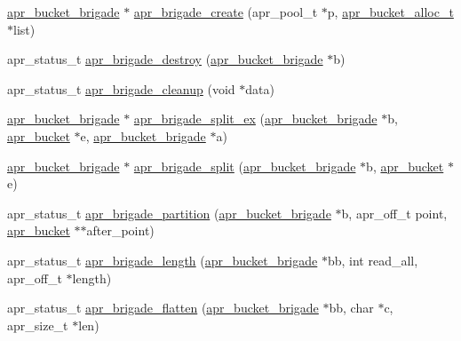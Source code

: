 \begin{DoxyCompactItemize}
\item 
\hyperlink{structapr__bucket__brigade}{apr\-\_\-bucket\-\_\-brigade} $\ast$ \hyperlink{group___a_p_r___util___bucket___brigades_gaeb422371006699c68f0ed3b496cc12a2}{apr\-\_\-brigade\-\_\-create} (apr\-\_\-pool\-\_\-t $\ast$p, \hyperlink{group___a_p_r___util___bucket___brigades_ga9a30babfeb6e290db124d8f9b69e49e4}{apr\-\_\-bucket\-\_\-alloc\-\_\-t} $\ast$list)
\item 
apr\-\_\-status\-\_\-t \hyperlink{group___a_p_r___util___bucket___brigades_ga2eba1e262dece0d4444ddd25ae7b250a}{apr\-\_\-brigade\-\_\-destroy} (\hyperlink{structapr__bucket__brigade}{apr\-\_\-bucket\-\_\-brigade} $\ast$b)
\item 
apr\-\_\-status\-\_\-t \hyperlink{group___a_p_r___util___bucket___brigades_gafd6a8378a15e8b42a57a5923a03de7f2}{apr\-\_\-brigade\-\_\-cleanup} (void $\ast$data)
\item 
\hyperlink{structapr__bucket__brigade}{apr\-\_\-bucket\-\_\-brigade} $\ast$ \hyperlink{group___a_p_r___util___bucket___brigades_ga36448fa89ab3239fd46591fbc82624e6}{apr\-\_\-brigade\-\_\-split\-\_\-ex} (\hyperlink{structapr__bucket__brigade}{apr\-\_\-bucket\-\_\-brigade} $\ast$b, \hyperlink{structapr__bucket}{apr\-\_\-bucket} $\ast$e, \hyperlink{structapr__bucket__brigade}{apr\-\_\-bucket\-\_\-brigade} $\ast$a)
\item 
\hyperlink{structapr__bucket__brigade}{apr\-\_\-bucket\-\_\-brigade} $\ast$ \hyperlink{group___a_p_r___util___bucket___brigades_gacaf2929f951920a464e170baf2b4c345}{apr\-\_\-brigade\-\_\-split} (\hyperlink{structapr__bucket__brigade}{apr\-\_\-bucket\-\_\-brigade} $\ast$b, \hyperlink{structapr__bucket}{apr\-\_\-bucket} $\ast$e)
\item 
apr\-\_\-status\-\_\-t \hyperlink{group___a_p_r___util___bucket___brigades_ga4b2f22ba70ac9f65788014c61d4f5b76}{apr\-\_\-brigade\-\_\-partition} (\hyperlink{structapr__bucket__brigade}{apr\-\_\-bucket\-\_\-brigade} $\ast$b, apr\-\_\-off\-\_\-t point, \hyperlink{structapr__bucket}{apr\-\_\-bucket} $\ast$$\ast$after\-\_\-point)
\item 
apr\-\_\-status\-\_\-t \hyperlink{group___a_p_r___util___bucket___brigades_ga65075839e31fd85e2c80717f4e9e0461}{apr\-\_\-brigade\-\_\-length} (\hyperlink{structapr__bucket__brigade}{apr\-\_\-bucket\-\_\-brigade} $\ast$bb, int read\-\_\-all, apr\-\_\-off\-\_\-t $\ast$length)
\item 
apr\-\_\-status\-\_\-t \hyperlink{group___a_p_r___util___bucket___brigades_ga301aeb943e68ef4b99c1ae6a18dcf78e}{apr\-\_\-brigade\-\_\-flatten} (\hyperlink{structapr__bucket__brigade}{apr\-\_\-bucket\-\_\-brigade} $\ast$bb, char $\ast$c, apr\-\_\-size\-\_\-t $\ast$len)
$$
\end{DoxyCompactItemize}
